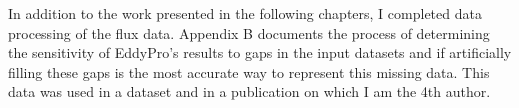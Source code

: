 In addition to the work presented in the following chapters, I completed data processing of the flux data. Appendix B documents the process of determining the sensitivity of EddyPro's results to gaps in the input datasets and if artificially filling these gaps is the most accurate way to represent this missing data. This data was used in a dataset \citep{nicefluxes:2017} and in a publication \citep{walden:2017} on which I am the 4th author.



